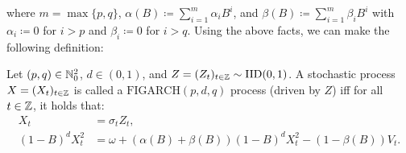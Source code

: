 where $m=\max\{p,q\}$, $\alpha(B)\coloneqq \sum_{i=1}^{m}\alpha_{i}B^{i}$, and $\beta(B)\coloneqq \sum_{i=1}^{m}\beta_{i}B^{i}$ with $\alpha_{i}\coloneqq 0$ for $i>p$ and $\beta_{i}\coloneqq 0$ for $i>q$. Using the above facts, we can make the following definition: 
\begin{defn}
Let $(p,q)\in \mathbb{N}_{0}^{2}$, $d\in (0,1)$, and $Z=(Z_{t})_{t\in\mathbb{Z}}\sim \textrm{IID}(0,1)$. A stochastic process $X=(X_{t})_{t\in\mathbb{Z}}$ is called a $\mathrm{FIGARCH}(p,d,q)$ process (driven by $Z$) iff for all $t\in\mathbb{Z}$, it holds that:
\begin{subequations}
\begin{align}
    X_{t}& =\sigma_{t}Z_{t},\\
    (1-B)^{d}X_{t}^{2}&=\omega+\left(\alpha(B)+\beta(B)\right)(1-B)^{d}X_{t}^{2}-\left(1-\beta(B)\right)V_{t}.
\end{align}
\end{subequations}
\end{defn}

